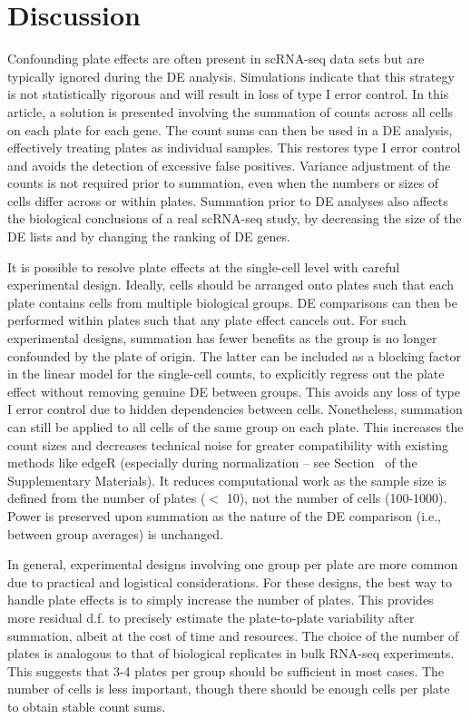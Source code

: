 \documentclass[oupdraft]{bio}
\begin{document}
\section{Discussion}
Confounding plate effects are often present in scRNA-seq data sets but are typically ignored during the DE analysis.
Simulations indicate that this strategy is not statistically rigorous and will result in loss of type I error control. 
In this article, a solution is presented involving the summation of counts across all cells on each plate for each gene.
The count sums can then be used in a DE analysis, effectively treating plates as individual samples.
This restores type I error control and avoids the detection of excessive false positives.
Variance adjustment of the counts is not required prior to summation, even when the numbers or sizes of cells differ across or within plates.
Summation prior to DE analyses also affects the biological conclusions of a real scRNA-seq study, 
    by decreasing the size of the DE lists and by changing the ranking of DE genes.

It is possible to resolve plate effects at the single-cell level with careful experimental design.
Ideally, cells should be arranged onto plates such that each plate contains cells from multiple biological groups.
DE comparisons can then be performed within plates such that any plate effect cancels out.
For such experimental designs, summation has fewer benefits as the group is no longer confounded by the plate of origin.
The latter can be included as a blocking factor in the linear model for the single-cell counts, 
    to explicitly regress out the plate effect without removing genuine DE between groups.
This avoids any loss of type I error control due to hidden dependencies between cells.
Nonetheless, summation can still be applied to all cells of the same group on each plate.
This increases the count sizes and decreases technical noise for greater compatibility with existing methods like edgeR
    (especially during normalization -- see Section~\suppnorm{} of the Supplementary Materials).
It reduces computational work as the sample size is defined from the number of plates ($<$ 10), not the number of cells (100-1000).
Power is preserved upon summation as the nature of the DE comparison (i.e., between group averages) is unchanged.

In general, experimental designs involving one group per plate are more common due to practical and logistical considerations.
For these designs, the best way to handle plate effects is to simply increase the number of plates.
This provides more residual d.f. to precisely estimate the plate-to-plate variability after summation, albeit at the cost of time and resources.
The choice of the number of plates is analogous to that of biological replicates in bulk RNA-seq experiments.
This suggests that 3-4 plates per group should be sufficient in most cases.
The number of cells is less important, though there should be enough cells per plate to obtain stable count sums.
\end{document}
